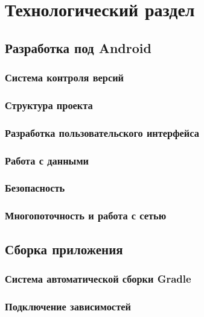 \chapter{Технологический раздел}
\label{ch:tech}


\section{Разработка под Android}
\label{sec:dev}

\subsection{Система контроля версий}
\label{subsec:vcs}

\subsection{Структура проекта}
\label{subsec:arch}

\subsection{Разработка пользовательского интерфейса}
\label{subsec:ui}

\subsection{Работа с данными}
\label{subsec:data}

\subsection{Безопасность}
\label{subsec:security}

\subsection{Многопоточность и работа с сетью}
\label{subsec:async}


\section{Сборка приложения}
\label{sec:build}

\subsection{Система автоматической сборки Gradle}
\label{subsec:gradle}

\subsection{Подключение зависимостей}
\label{subsec:libs}

